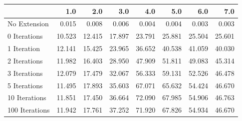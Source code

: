 \begin{tabular}{lrrrrrrr}
\toprule
{} &    1.0 &    2.0 &    3.0 &    4.0 &    5.0 &    6.0 &    7.0 \\
\midrule
No Extension   &  0.015 &  0.008 &  0.006 &  0.004 &  0.004 &  0.003 &  0.003 \\
0 Iterations   & 10.523 & 12.415 & 17.897 & 23.791 & 25.881 & 25.504 & 25.601 \\
1 Iteration    & 12.141 & 15.425 & 23.965 & 36.652 & 40.538 & 41.059 & 40.030 \\
2 Iterations   & 11.982 & 16.403 & 28.950 & 47.909 & 51.811 & 49.083 & 45.314 \\
3 Iterations   & 12.079 & 17.479 & 32.067 & 56.333 & 59.131 & 52.526 & 46.478 \\
5 Iterations   & 11.495 & 17.893 & 35.603 & 67.071 & 65.632 & 54.424 & 46.670 \\
10 Iterations  & 11.851 & 17.450 & 36.664 & 72.090 & 67.985 & 54.906 & 46.763 \\
100 Iterations & 11.942 & 17.761 & 37.252 & 71.920 & 67.826 & 54.934 & 46.670 \\
\bottomrule
\end{tabular}
